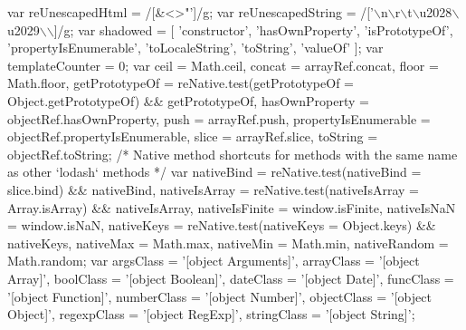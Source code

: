 \begin{DoxyCodeInclude}
  var reUnescapedHtml = /[&<>\textcolor{stringliteral}{"']/g;}
\textcolor{stringliteral}{}
\textcolor{stringliteral}{  var reUnescapedString = /['\(\backslash\)n\(\backslash\)r\(\backslash\)t\(\backslash\)u2028\(\backslash\)u2029\(\backslash\)\(\backslash\)]/g;}
\textcolor{stringliteral}{}
\textcolor{stringliteral}{  var shadowed = [}
\textcolor{stringliteral}{    'constructor', 'hasOwnProperty', 'isPrototypeOf', 'propertyIsEnumerable',}
\textcolor{stringliteral}{    'toLocaleString', 'toString', 'valueOf'}
\textcolor{stringliteral}{  ];}
\textcolor{stringliteral}{}
\textcolor{stringliteral}{  var templateCounter = 0;}
\textcolor{stringliteral}{}
\textcolor{stringliteral}{  var ceil = Math.ceil,}
\textcolor{stringliteral}{      concat = arrayRef.concat,}
\textcolor{stringliteral}{      floor = Math.floor,}
\textcolor{stringliteral}{      getPrototypeOf = reNative.test(getPrototypeOf = Object.getPrototypeOf) && getPrototypeOf,}
\textcolor{stringliteral}{      hasOwnProperty = objectRef.hasOwnProperty,}
\textcolor{stringliteral}{      push = arrayRef.push,}
\textcolor{stringliteral}{      propertyIsEnumerable = objectRef.propertyIsEnumerable,}
\textcolor{stringliteral}{      slice = arrayRef.slice,}
\textcolor{stringliteral}{      toString = objectRef.toString;}
\textcolor{stringliteral}{}
\textcolor{stringliteral}{  /* Native method shortcuts for methods with the same name as other `lodash` methods */}
\textcolor{stringliteral}{  var nativeBind = reNative.test(nativeBind = slice.bind) && nativeBind,}
\textcolor{stringliteral}{      nativeIsArray = reNative.test(nativeIsArray = Array.isArray) && nativeIsArray,}
\textcolor{stringliteral}{      nativeIsFinite = window.isFinite,}
\textcolor{stringliteral}{      nativeIsNaN = window.isNaN,}
\textcolor{stringliteral}{      nativeKeys = reNative.test(nativeKeys = Object.keys) && nativeKeys,}
\textcolor{stringliteral}{      nativeMax = Math.max,}
\textcolor{stringliteral}{      nativeMin = Math.min,}
\textcolor{stringliteral}{      nativeRandom = Math.random;}
\textcolor{stringliteral}{}
\textcolor{stringliteral}{  var argsClass = '[object Arguments]',}
\textcolor{stringliteral}{      arrayClass = '[object Array]',}
\textcolor{stringliteral}{      boolClass = '[object Boolean]',}
\textcolor{stringliteral}{      dateClass = '[object Date]',}
\textcolor{stringliteral}{      funcClass = '[object Function]',}
\textcolor{stringliteral}{      numberClass = '[object Number]',}
\textcolor{stringliteral}{      objectClass = '[object Object]',}
\textcolor{stringliteral}{      regexpClass = '[object RegExp]',}
\textcolor{stringliteral}{      stringClass = '[object String]';}

\end{DoxyCodeInclude}
